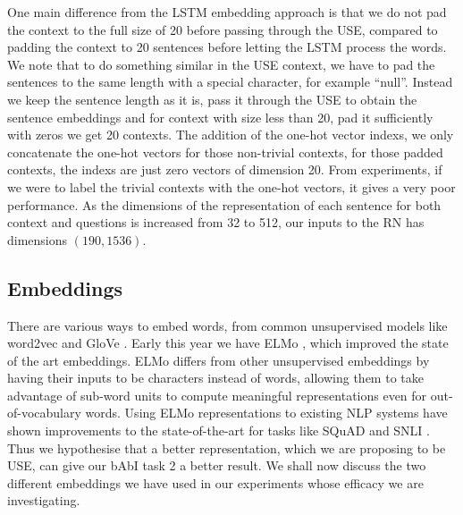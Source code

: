 \documentclass{article}
\begin{document}
One main difference from the LSTM embedding approach is that we do not pad the context to the full size of 20 before passing through the USE, compared to padding the context to 20 sentences before letting the LSTM process the words. We note that to do something similar in the USE context, we have to pad the sentences to the same length with a special character, for example ``null''. Instead we keep the sentence length as it is, pass it through the USE to obtain the sentence embeddings and for context with size less than 20, pad it sufficiently with zeros we get 20 contexts. The addition of the one-hot vector indexs, we only concatenate the one-hot vectors for those non-trivial contexts, for those padded contexts, the indexs are just zero vectors of dimension 20. From experiments, if we were to label the trivial contexts with the one-hot vectors, it gives a very poor performance. As the dimensions of the representation of each sentence for both context and questions is increased from 32 to 512, our inputs to the RN has dimensions $(190,1536)$. 








\subsection{Embeddings}

There are various ways to embed words, from common unsupervised models like word2vec \cite{word2vec} and GloVe \cite{pennington2014glove}. Early this year we have ELMo \cite{N18-1202}, which improved the state of the art embeddings. ELMo differs from other unsupervised embeddings by having their inputs to be characters instead of words, allowing them to take advantage of sub-word units to compute meaningful representations even for out-of-vocabulary words. Using ELMo representations to existing NLP systems have shown improvements to the state-of-the-art for tasks like SQuAD \cite{RajpurkarZLL16} and SNLI \cite{snli:emnlp2015}. Thus we hypothesise that a better representation, which we are proposing to be USE, can give our bAbI task 2 a better result. We shall now discuss the two different embeddings we have used in our experiments whose efficacy we are investigating.
\end{document}
